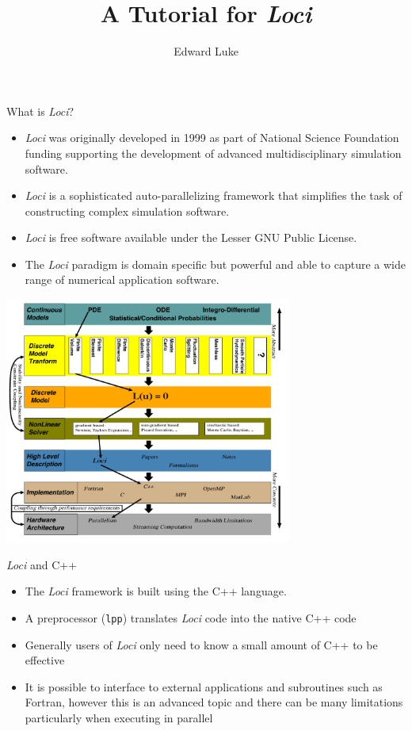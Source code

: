 \documentclass{beamer}
\title{A Tutorial for {\em Loci}}
\author{Edward Luke}
\begin{document}
\begin{frame}
\titlepage
\end{frame}

\begin{frame}{What is {\em Loci}?}
\begin{itemize}
\item {\em Loci} was originally developed in 1999 as part of National Science Foundation funding supporting the development of advanced multidisciplinary simulation software.
\item {\em Loci} is a sophisticated auto-parallelizing framework that simplifies the task of constructing complex simulation software.
\item {\em Loci} is free software available under the Lesser GNU Public License.
\item The {\em Loci} paradigm is domain specific but powerful and able to capture a wide range of numerical application software.
\end{itemize}
\end{frame}
\begin{frame}{}
\begin{center}
\includegraphics[height=3.2in]{architecture}
\end{center}
\end{frame}
\begin{frame}{{\em Loci} and C++}
\begin{itemize}
\item The {\em Loci} framework is built using the C++ language.
\item A preprocessor ({\tt lpp}) translates {\em Loci} code into the native C++ code
\item Generally users of {\it Loci} only need to know a small amount of C++ to be effective
\item It is possible to interface to external applications and subroutines such as Fortran, however this is an advanced topic and there can be many limitations particularly when executing in parallel
\end{itemize}
\end{frame}
\end{document}
